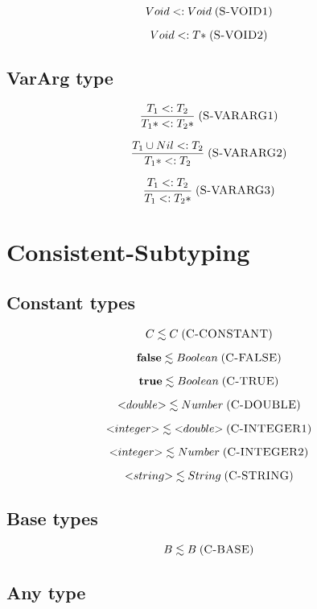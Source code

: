 \documentclass[12pt]{article}
\newcommand{\mylabel}[1]{\; (\textsc{#1})}
\newcommand{\subtype}{<:}
\begin{document}
\[
Void \subtype Void
\mylabel{S-VOID1}
\]

\[
Void \subtype {T*}
\mylabel{S-VOID2}
\]


\subsection{VarArg type}

\[
\frac{T_{1} \subtype T_{2}}
     {{T_{1}*} \subtype {T_{2}*}}
\mylabel{S-VARARG1}
\]

\[
\frac{T_{1} \cup Nil \subtype T_{2}}
     {{T_{1}*} \subtype T_{2}}
\mylabel{S-VARARG2}
\]

\[
\frac{T_{1} \subtype T_{2}}
     {T_{1} \subtype {T_{2}*}}
\mylabel{S-VARARG3}
\]

%

\section{Consistent-Subtyping}

\subsection{Constant types}

\[
C \lesssim C
\mylabel{C-CONSTANT}
\]

\[
\mathbf{false} \lesssim Boolean
\mylabel{C-FALSE}
\]

\[
\mathbf{true} \lesssim Boolean
\mylabel{C-TRUE}
\]

\[
{<}double{>} \lesssim Number
\mylabel{C-DOUBLE}
\]

\[
{<}integer{>} \lesssim {<}double{>}
\mylabel{C-INTEGER1}
\]

\[
{<}integer{>} \lesssim Number
\mylabel{C-INTEGER2}
\]

\[
{<}string{>} \lesssim String
\mylabel{C-STRING}
\]

\subsection{Base types}

\[
B \lesssim B
\mylabel{C-BASE}
\]

\subsection{Any type}
\end{document}
